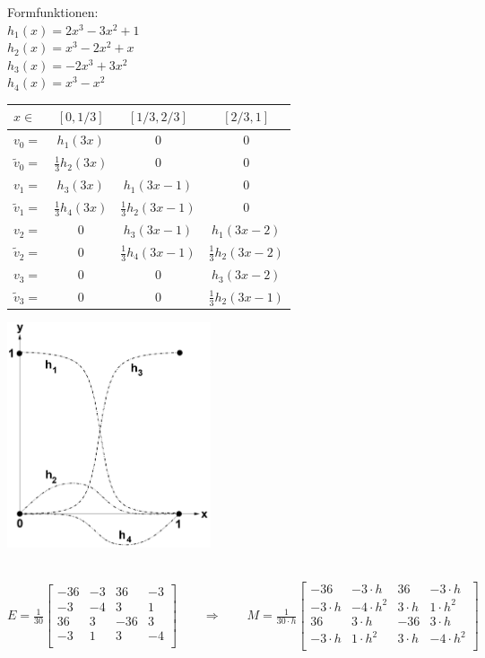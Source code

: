 \begin{minipage}{4cm}
Formfunktionen:\\
$h_1(x)=2x^3-3x^2+1$\\
$h_2(x)=x^3-2x^2+x$\\
$h_3(x)=-2x^3+3x^2$\\
$h_4(x)=x^3-x^2$
\end{minipage}
\hfill
\begin{minipage}{8cm}
	\begin{tabular}{lc|c|c}
		$x\in$&$[0,1/3]$&$[1/3,2/3]$&$[2/3,1]$\\
		\hline
		$v_0=$&$h_1(3x)$&$0$&$0$\\
		$\tilde{v}_0=$&$\frac 13 h_2(3x)$&$0$&$0$\\
		$v_1=$&$h_3(3x)$&$h_1(3x-1)$&$0$\\
		$\tilde{v}_1=$&$\frac 13 h_4(3x)$&$\frac 13 h_2(3x-1)$&$0$\\
		$v_2=$&$0$&$h_3(3x-1)$&$h_1(3x-2)$\\
		$\tilde{v}_2=$&$0$&$\frac 13 h_4(3x-1)$&$\frac 13 h_2(3x-2)$\\
		$v_3=$&$0$&$0$&$h_3(3x-2)$\\
		$\tilde{v}_3=$&$0$&$0$&$\frac 13 h_2(3x-1)$\\
	\end{tabular}
\end{minipage}
\hfill
\begin{minipage}{6cm}
\includegraphics[width=6cm]{Content/Numerik/FEM3Ord}
\end{minipage}\\
$E=\frac{1}{30}
\begin{bmatrix}
	-36 & -3 & 36 & -3\\
	-3 & -4 & 3 & 1\\
	36 & 3 & -36 & 3\\
	-3 & 1 & 3 & -4\\
\end{bmatrix}\qquad\Rightarrow\qquad
\boxed{M=\frac{1}{30\cdot h}
\begin{bmatrix}
	-36 & -3\cdot h & 36 & -3\cdot h\\
	-3\cdot h & -4\cdot h^2 & 3\cdot h & 1\cdot h^2\\
	36 & 3\cdot h & -36 & 3\cdot h\\
	-3\cdot h & 1\cdot h^2 & 3\cdot h & -4\cdot h^2\\
\end{bmatrix}}$\\
\\


